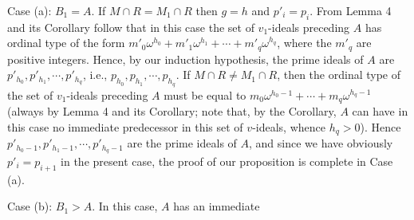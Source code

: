 Case (a): $B_1 = A$. If $M \cap R = M_1 \cap R$ then $g = h$ and $p'_i = p_i$. From Lemma 4 and its Corollary follow that in this case the set of $v_1$-ideals preceding $A$ has ordinal type of the form $m'_0 \omega^{h_0} + m'_1 \omega^{h_1} + \cdots + m'_q \omega^{h_q}$, where the $m'_q$ are positive integers. Hence, by our induction hypothesis, the prime ideals of $A$ are $p'_h_0, p'_h_1, \cdots, p'_h_q$, i.e., $p_{h_0}, p_{h_1}, \cdots, p_{h_q}$. If $M \cap R \neq M_1 \cap R$, then the ordinal type of the set of $v_1$-ideals preceding $A$ must be equal to $m_0 \omega^{h_0-1} + \cdots + m_q \omega^{h_q-1}$ (always by Lemma 4 and its Corollary; note that, by the Corollary, $A$ can have in this case no immediate predecessor in this set of $v$-ideals, whence $h_q > 0$). Hence $p'_{h_0-1}, p'_{h_1-1}, \cdots, p'_{h_q-1}$ are the prime ideals of $A$, and since we have obviously $p'_i = p_{i+1}$ in the present case, the proof of our proposition is complete in Case (a).

Case (b): $B_1 > A$. In this case, $A$ has an immediate